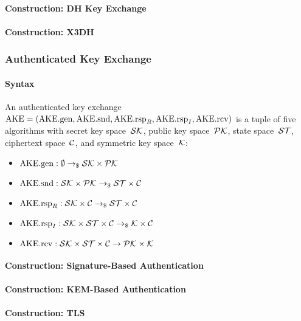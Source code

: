 \documentclass[a4paper,orivec]{llncs}
\begin{document}
\paragraph{Construction: DH Key Exchange}

\paragraph{Construction: X3DH}

\subsubsection{Authenticated Key Exchange}

\paragraph{Syntax}
An authenticated key exchange $\mathrm{AKE}=(\mathrm{AKE}.\mathrm{gen},\allowbreak\mathrm{AKE}.\mathrm{snd},\allowbreak\mathrm{AKE}.\mathrm{rsp}_R,\allowbreak\mathrm{AKE}.\mathrm{rsp}_I,\allowbreak\mathrm{AKE}.\mathrm{rcv})$ is a tuple of five algorithms with secret key space~$\mathcal{SK}$, public key space~$\mathcal{PK}$, state space~$\mathcal{ST}$, ciphertext space~$\mathcal{C}$, and symmetric key space~$\mathcal{K}$:

\begin{itemize}
    \item $\mathrm{AKE}.\mathrm{gen}: \emptyset \to_\$ \mathcal{SK}\times\mathcal{PK}$
    \item $\mathrm{AKE}.\mathrm{snd}: \mathcal{SK}\times\mathcal{PK} \to_\$ \mathcal{ST}\times\mathcal{C}$
    \item $\mathrm{AKE}.\mathrm{rsp}_R: \mathcal{SK}\times\mathcal{C} \to_\$ \mathcal{ST}\times\mathcal{C}$
    \item $\mathrm{AKE}.\mathrm{rsp}_I: \mathcal{SK}\times\mathcal{ST}\times\mathcal{C} \to_\$ \mathcal{K}\times\mathcal{C}$
    \item $\mathrm{AKE}.\mathrm{rcv}: \mathcal{SK}\times\mathcal{ST}\times\mathcal{C} \to \mathcal{PK}\times\mathcal{K}$
\end{itemize}

\paragraph{Construction: Signature-Based Authentication}

\paragraph{Construction: KEM-Based Authentication}

\paragraph{Construction: TLS}
\end{document}
